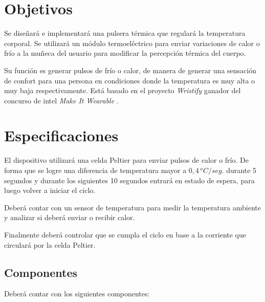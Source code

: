 \documentclass[10pt,spanish,a4paper,openany,notitlepage]{article}
\begin{document}
\tableofcontents
\newpage

\section{Objetivos}
Se diseñará e implementará una pulsera térmica que regulará la
temperatura corporal. Se utilizará un módulo termoeléctrico para enviar
variaciones de calor o frío a la muñeca del usuario para modificar
la percepción térmica del cuerpo.


Su función es generar pulsos de frío o calor, de manera de generar una sensación de 
confort para una persona en condiciones donde la temperatura es muy alta 
o muy baja respectivamente.
Está basado en el proyecto \emph{Wristify} \cite{embrlabs} ganador del concurso de intel 
\emph{Make It Wearable} \cite{Make It Wearable}.

\section{Especificaciones}

El dispositivo utilizará una celda Peltier para enviar pulsos de calor
o frío. De forma que se logre una diferencia de temperatura mayor a $0,4\, \unit{^oC/seg.}$
durante 5 segundos y durante los siguientes 10 segundos entrará
en estado de espera, para luego volver a iniciar el ciclo. 

Deberá contar con un sensor de temperatura para medir la temperatura ambiente
y analizar si deberá enviar o recibir calor.

Finalmente deberá controlar que se cumpla el ciclo en base a la corriente
que circulará por la celda Peltier.

\subsection{Componentes}

Deberá contar con los siguientes componentes:
\end{document}
